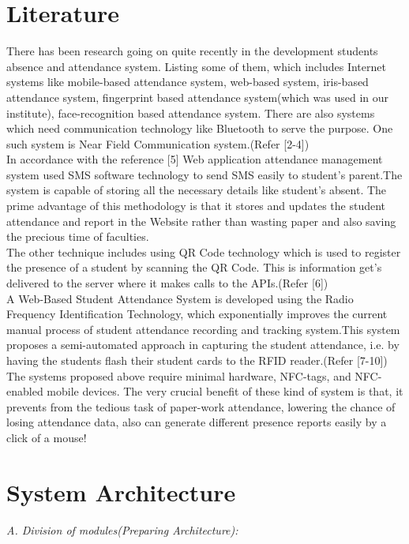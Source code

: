 \documentclass[conference]{IEEEtran}
\begin{document}
\section{Literature}
There has been research going on quite recently in the development students absence and attendance system. Listing some of them, which includes Internet systems like mobile-based  attendance  system, web-based  system, iris-based attendance system, fingerprint based attendance system(which was used in our institute), face-recognition based attendance system.
There are also systems which need communication technology like Bluetooth to serve the purpose. One such system is Near Field Communication system.(Refer [2-4])\\
In accordance with the reference [5] Web application attendance management system used SMS software technology to send SMS easily to student's parent.The system is capable of storing all the necessary details like student's absent. The prime advantage of this methodology is that it stores and updates the student attendance and report in the Website rather than wasting paper and also saving the precious time of faculties.\\ 
The other technique includes using QR Code technology which is used to register the presence of a student by scanning the QR Code. This is information get's delivered to the server where it makes calls to the APIs.(Refer [6])\\
A Web-Based Student Attendance System is developed using the Radio Frequency Identification Technology, which exponentially improves the current manual process of student attendance recording and tracking system.This system proposes a semi-automated approach in capturing the student attendance, i.e. by having the students flash their student cards to the RFID reader.(Refer [7-10])\\
The systems proposed above require minimal hardware, NFC-tags, and NFC-enabled mobile devices. The very crucial benefit of these kind of system is that, it prevents from the tedious task of paper-work attendance, lowering the chance of losing attendance data, also can generate different presence reports easily by a click of a mouse!

\section{System Architecture}

\emph {A. Division of modules(Preparing Architecture):}\\
\end{document}
